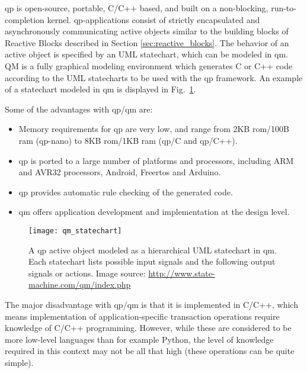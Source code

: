 \gls{qp} is open-source, portable, C/C++ based, and built on a non-blocking, run-to-completion kernel. \gls{qp}-applications consist of strictly encapsulated and asynchronously communicating active objects similar to the building blocks of Reactive Blocks described in Section \ref{sec:reactive_blocks}. The behavior of an active object is specified by an UML statechart, which can be modeled in \gls{qm}. QM is a fully graphical modeling environment which generates C or C++ code according to the UML statecharts to be used with the \gls{qp} framework. An example of a statechart modeled in \gls{qm} is displayed in Fig.~\ref{figure:qm_statechart}.

Some of the advantages with \gls{qp}/\gls{qm} are:
\begin{itemize}
	\item Memory requirements for \gls{qp} are very low, and range from 2KB \gls{rom}/100B \gls{ram} (\gls{qp}-nano) to 8KB \gls{rom}/1KB \gls{ram} (\gls{qp}/C and \gls{qp}/C++).
	\item \gls{qp} is ported to a large number of platforms and processors, including ARM and AVR32 processors, Android, Free\gls{rtos} and Arduino.
	\item \gls{qp} provides automatic rule checking of the generated code.
	\item \gls{qm} offers application development and implementation at the design level.
\end{itemize}

\begin{figure}[htp]
	\centering
	\texttt{[image: qm\_statechart]}
	\caption[An UML statechart in QM]{A \gls{qp} active object modeled as a hierarchical UML statechart in \gls{qm}. Each statechart lists possible input signals and the following output signals or actions. Image source: \url{http://www.state-machine.com/qm/index.php}}
	\label{figure:qm_statechart}
\end{figure}

The major disadvantage with \gls{qp}/\gls{qm} is that it is implemented in C/C++, which means implementation of application-specific transaction operations require knowledge of C/C++ programming. However, while these are considered to be more low-level languages than for example Python, the level of knowledge required in this context may not be all that high (these operations can be quite simple).

